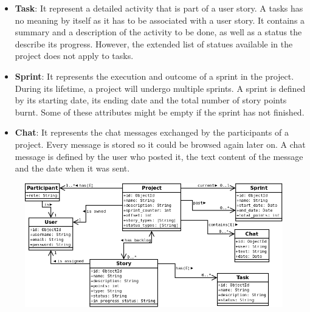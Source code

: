\documentclass[
	accentcolor=tud1a %
]{tudreport}
\begin{document}
\begin{itemize}
\item \textbf{Task}: It represent a detailed activity that is part of a user story. A tasks has no meaning by itself as it has to be associated with a user story. It contains a summary and a description of the activity to be done, as well as a status the describe its progress. However, the extended list of statues available in the project does not apply to tasks.

\item \textbf{Sprint}: It represents the execution and outcome of a sprint in the project. During its lifetime, a project will undergo multiple sprints. A sprint is defined by its starting date, its ending date and the total number of story points burnt. Some of these attributes might be empty if the sprint has not finished.

\item \textbf{Chat}: It represents the chat messages exchanged by the participants of a project. Every message is stored so it could be browsed again later on. A chat message is defined by the user who posted it, the text content of the message and the date when it was sent.

\end{itemize}

\begin{figure}
  \centering
    \includegraphics[height=20EM]{img/class-diagram}
    \label{fig:class-diagram}
\end{figure}

\end{document}
